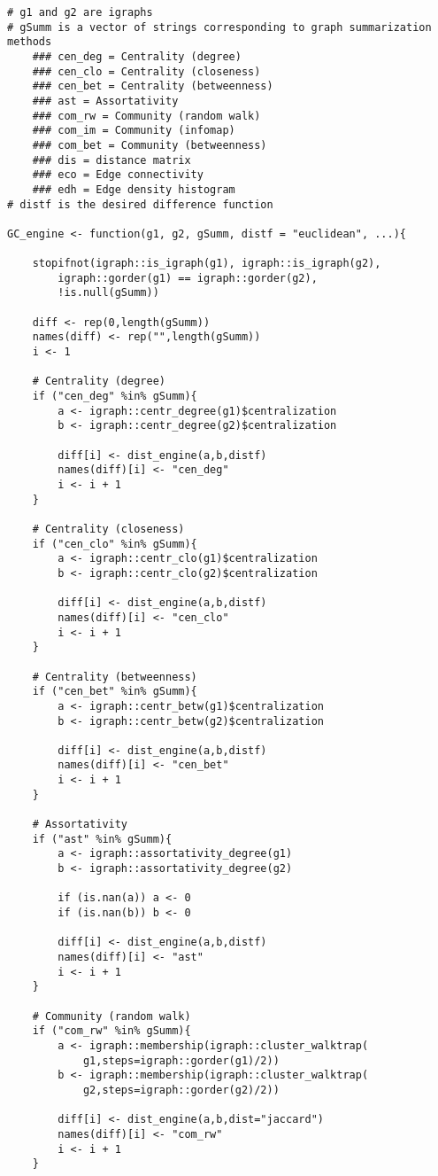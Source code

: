 {
\begin{lstlisting}
# g1 and g2 are igraphs
# gSumm is a vector of strings corresponding to graph summarization methods
	### cen_deg = Centrality (degree)
	### cen_clo = Centrality (closeness)
	### cen_bet = Centrality (betweenness)
	### ast = Assortativity
	### com_rw = Community (random walk)
	### com_im = Community (infomap)
	### com_bet = Community (betweenness)
	### dis = distance matrix
	### eco = Edge connectivity
	### edh = Edge density histogram
# distf is the desired difference function

GC_engine <- function(g1, g2, gSumm, distf = "euclidean", ...){

	stopifnot(igraph::is_igraph(g1), igraph::is_igraph(g2), 
		igraph::gorder(g1) == igraph::gorder(g2),
		!is.null(gSumm))
	
	diff <- rep(0,length(gSumm))
	names(diff) <- rep("",length(gSumm))
	i <- 1
	
	# Centrality (degree)
	if ("cen_deg" %in% gSumm){
		a <- igraph::centr_degree(g1)$centralization
		b <- igraph::centr_degree(g2)$centralization
		
		diff[i] <- dist_engine(a,b,distf)
		names(diff)[i] <- "cen_deg"
		i <- i + 1
	}
	
	# Centrality (closeness)
	if ("cen_clo" %in% gSumm){
		a <- igraph::centr_clo(g1)$centralization
		b <- igraph::centr_clo(g2)$centralization
		
		diff[i] <- dist_engine(a,b,distf)
		names(diff)[i] <- "cen_clo"
		i <- i + 1
	}
	
	# Centrality (betweenness)
	if ("cen_bet" %in% gSumm){
		a <- igraph::centr_betw(g1)$centralization
		b <- igraph::centr_betw(g2)$centralization
		
		diff[i] <- dist_engine(a,b,distf)
		names(diff)[i] <- "cen_bet"
		i <- i + 1
	}
	
	# Assortativity
	if ("ast" %in% gSumm){
		a <- igraph::assortativity_degree(g1)
		b <- igraph::assortativity_degree(g2)
		
		if (is.nan(a)) a <- 0
		if (is.nan(b)) b <- 0
		
		diff[i] <- dist_engine(a,b,distf)
		names(diff)[i] <- "ast"
		i <- i + 1
	}
	
	# Community (random walk)
	if ("com_rw" %in% gSumm){
		a <- igraph::membership(igraph::cluster_walktrap(
			g1,steps=igraph::gorder(g1)/2))
		b <- igraph::membership(igraph::cluster_walktrap(
			g2,steps=igraph::gorder(g2)/2))
		
		diff[i] <- dist_engine(a,b,dist="jaccard")
		names(diff)[i] <- "com_rw"
		i <- i + 1
	}
	

\end{lstlisting}}
